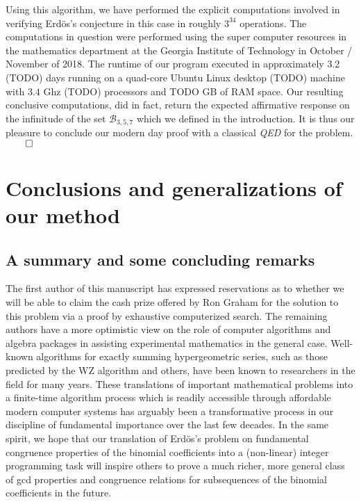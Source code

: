 \documentclass[12pt]{article}
\begin{document}
Using this algorithm, 
we have performed the explicit computations involved in verifying Erd\"os's conjecture in this case in 
roughly $3^{34}$ operations. The computations in question were performed using the 
super computer resources in the mathematics department at the Georgia Institute of Technology in 
October / November of 2018. The runtime of our program executed in approximately 3.2 (TODO) days 
running on a quad-core Ubuntu Linux desktop (TODO) machine with $3.4$ Ghz (TODO) processors and 
TODO GB of RAM space. Our resulting 
conclusive computations, did in fact, return the expected affirmative response on the infinitude of the 
set $\mathcal{B}_{3,5,7}$ which we defined in the introduction. It is thus our pleasure to conclude our 
modern day proof with a classical \emph{QED} for the problem. \hfill{$\qed$}  

\section{Conclusions and generalizations of our method} 

\subsection{A summary and some concluding remarks}

The first author of this manuscript has expressed reservations as to whether we will be able to 
claim the cash prize offered by Ron Graham for the solution to this problem via a proof by 
exhaustive computerized search. The remaining authors have a more optimistic view on the role 
of computer algorithms and algebra packages in assisting experimental mathematics in the 
general case. Well-known algorithms for exactly summing hypergeometric series, such as those 
predicted by the WZ algorithm and others, have been known to researchers in the field for many years. 
These translations of important mathematical problems into a finite-time algorithm process which is 
readily accessible through affordable modern computer systems has arguably been a transformative 
process in our discipline of fundamental importance over the last few decades. In the same spirit, 
we hope that our translation of Erd\"os's problem on fundamental congruence properties of the 
binomial coefficients into a (non-linear) integer programming task will inspire others to prove a 
much richer, more general class of gcd properties and congruence relations for subsequences of the 
binomial coefficients in the future. 
\end{document}

